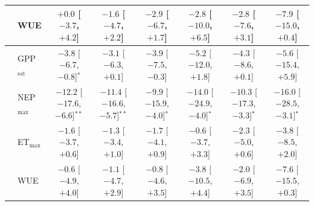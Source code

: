 \begin{table}[htbp]
{\begin{tabular}{llcccccc}
 & WUE & $+0.0$ {\tiny[$-3.7$, $+4.2$]} & $-1.6$ {\tiny[$-4.7$, $+2.2$]} & $-2.9$ {\tiny[$-6.7$, $+1.7$]} & $-2.8$ {\tiny[$-10.0$, $+6.5$]} & $-2.8$ {\tiny[$-7.6$, $+3.1$]} & $-7.9$ {\tiny[$-15.0$, $+0.4$]} \\
\midrule
{} & GPP$_\mathrm{sat}$ & $-3.8$ {\tiny[$-6.7$, $-0.8$]}$^{*}$ & $-3.1$ {\tiny[$-6.3$, $+0.1$]} & $-3.9$ {\tiny[$-7.5$, $-0.3$]} & $-5.2$ {\tiny[$-12.0$, $+1.8$]} & $-4.3$ {\tiny[$-8.6$, $+0.1$]} & $-5.6$ {\tiny[$-15.4$, $+5.9$]} \\
 & NEP$_\mathrm{max}$ & $-12.2$ {\tiny[$-17.6$, $-6.6$]}$^{**}$ & $-11.4$ {\tiny[$-16.6$, $-5.7$]}$^{**}$ & $-9.9$ {\tiny[$-15.9$, $-4.0$]}$^{*}$ & $-14.0$ {\tiny[$-24.9$, $-4.0$]}$^{*}$ & $-10.3$ {\tiny[$-17.3$, $-3.3$]}$^{*}$ & $-16.0$ {\tiny[$-28.5$, $-3.1$]}$^{*}$ \\
 & ET$_\mathrm{max}$ & $-1.6$ {\tiny[$-3.7$, $+0.6$]} & $-1.3$ {\tiny[$-3.4$, $+1.0$]} & $-1.7$ {\tiny[$-4.1$, $+0.9$]} & $-0.6$ {\tiny[$-3.7$, $+3.3$]} & $-2.3$ {\tiny[$-5.0$, $+0.6$]} & $-3.8$ {\tiny[$-8.5$, $+2.0$]} \\
 & WUE & $-0.6$ {\tiny[$-4.9$, $+4.0$]} & $-1.1$ {\tiny[$-4.7$, $+2.9$]} & $-0.8$ {\tiny[$-4.6$, $+3.5$]} & $-3.8$ {\tiny[$-10.5$, $+4.4$]} & $-2.0$ {\tiny[$-6.9$, $+3.5$]} & $-7.6$ {\tiny[$-15.5$, $+0.3$]} \\
\bottomrule
\end{tabular}}
\end{table}
